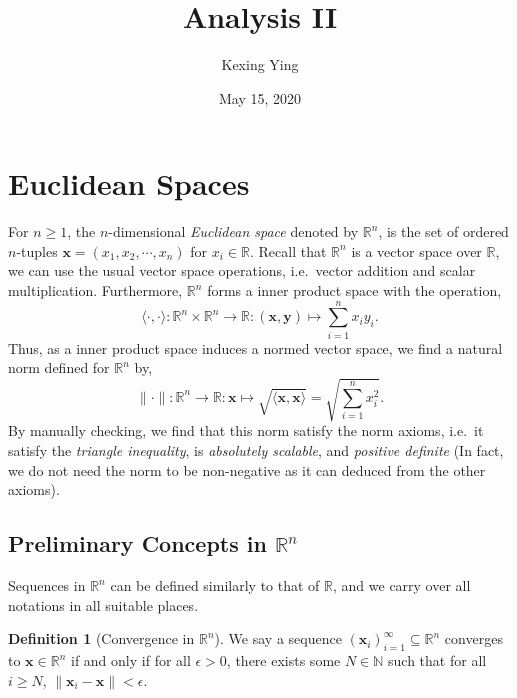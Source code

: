 \documentclass[
]{article}
\title{Analysis II}
\author{Kexing Ying}
\date{May 15, 2020}
\theoremstyle{definition}
\theoremstyle{definition}
\newtheorem{definition}{Definition}[section]
\begin{document}
\maketitle

{
\hypersetup{linkcolor=}
\setcounter{tocdepth}{2}
\tableofcontents
}
\newpage

\hypertarget{euclidean-spaces}{%
\section{Euclidean Spaces}\label{euclidean-spaces}}

For \(n \ge 1\), the \(n\)-dimensional \emph{Euclidean space} denoted by
\(\mathbb{R}^n\), is the set of ordered \(n\)-tuples
\(\mathbf{x} = (x_1, x_2, \cdots, x_n)\) for \(x_i \in \mathbb{R}\).
Recall that \(\mathbb{R}^n\) is a vector space over \(\mathbb{R}\), we
can use the usual vector space operations, i.e.~vector addition and
scalar multiplication. Furthermore, \(\mathbb{R}^n\) forms a inner
product space with the operation, \[
  \langle \cdot, \cdot \rangle : \mathbb{R}^n \times \mathbb{R}^n \to 
  \mathbb{R} : (\mathbf{x}, \mathbf{y}) \mapsto \sum_{i = 1}^n x_i y_i.
\] Thus, as a inner product space induces a normed vector space, we find
a natural norm defined for \(\mathbb{R}^n\) by, \[
  \| \cdot \| : \mathbb{R}^n \to \mathbb{R} : \mathbf{x} \mapsto 
  \sqrt{\langle \mathbf{x}, \mathbf{x} \rangle} = \sqrt{\sum_{i = 1}^n x_i^2}.
\] By manually checking, we find that this norm satisfy the norm axioms,
i.e.~it satisfy the \emph{triangle inequality}, is \emph{absolutely
scalable}, and \emph{positive definite} (In fact, we do not need the
norm to be non-negative as it can deduced from the other axioms).

\hypertarget{preliminary-concepts-in-mathbbrn}{%
\subsection{\texorpdfstring{Preliminary Concepts in
\(\mathbb{R}^n\)}{Preliminary Concepts in \textbackslash mathbb\{R\}\^{}n}}\label{preliminary-concepts-in-mathbbrn}}

Sequences in \(\mathbb{R}^n\) can be defined similarly to that of
\(\mathbb{R}\), and we carry over all notations in all suitable places.

\begin{definition}[Convergence in \(\mathbb{R}^n\)]
  We say a sequence \((\mathbf{x}_i)_{i = 1}^\infty \subseteq \mathbb{R}^n\) 
  converges to \(\mathbf{x} \in \mathbb{R}^n\) if and only if for all 
  \(\epsilon > 0\), there exists some \(N \in \mathbb{N}\) such that for all 
  \(i \ge N\), \(\|\mathbf{x}_i - \mathbf{x}\| < \epsilon\).
\end{definition}
\end{document}
